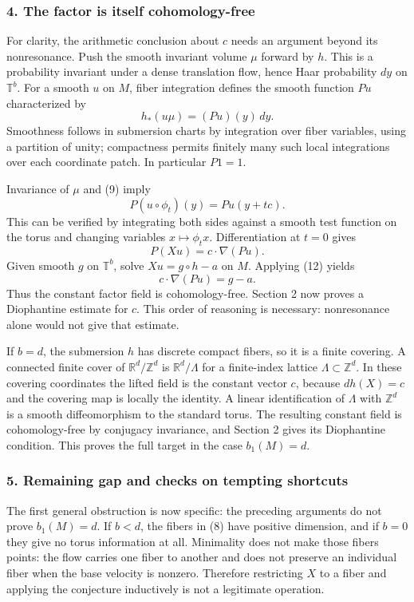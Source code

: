 \documentclass[11pt]{article}
\begin{document}
\subsubsection{4. The factor is itself cohomology-free}
For clarity, the arithmetic conclusion about $c$ needs an argument beyond its nonresonance. Push the smooth invariant volume $\mu$ forward by $h$. This is a probability invariant under a dense translation flow, hence Haar probability $dy$ on $\mathbb T^b$. For a smooth $u$ on $M$, fiber integration defines the smooth function $Pu$ characterized by
\[
 h_*(u\mu)=(Pu)(y)\,dy.                                 \tag{11}
\]
Smoothness follows in submersion charts by integration over fiber variables, using a partition of unity; compactness permits finitely many such local integrations over each coordinate patch. In particular $P1=1$.

Invariance of $\mu$ and (9) imply
\[
 P(u\circ\phi_t)(y)=Pu(y+tc).
\]
This can be verified by integrating both sides against a smooth test function on the torus and changing variables $x\mapsto\phi_t x$. Differentiation at $t=0$ gives
\[
 P(Xu)=c\cdot\nabla(Pu).                                \tag{12}
\]
Given smooth $g$ on $\mathbb T^b$, solve $Xu=g\circ h-a$ on $M$. Applying (12) yields
\[
 c\cdot\nabla(Pu)=g-a.
\]
Thus the constant factor field is cohomology-free. Section 2 now proves a Diophantine estimate for $c$. This order of reasoning is necessary: nonresonance alone would not give that estimate.

If $b=d$, the submersion $h$ has discrete compact fibers, so it is a finite covering. A connected finite cover of $\mathbb R^d/\mathbb Z^d$ is $\mathbb R^d/\Lambda$ for a finite-index lattice $\Lambda\subset\mathbb Z^d$. In these covering coordinates the lifted field is the constant vector $c$, because $dh(X)=c$ and the covering map is locally the identity. A linear identification of $\Lambda$ with $\mathbb Z^d$ is a smooth diffeomorphism to the standard torus. The resulting constant field is cohomology-free by conjugacy invariance, and Section 2 gives its Diophantine condition. This proves the full target in the case $b_1(M)=d$.

\subsubsection{5. Remaining gap and checks on tempting shortcuts}
The first general obstruction is now specific: the preceding arguments do not prove $b_1(M)=d$. If $b<d$, the fibers in (8) have positive dimension, and if $b=0$ they give no torus information at all. Minimality does not make those fibers points: the flow carries one fiber to another and does not preserve an individual fiber when the base velocity is nonzero. Therefore restricting $X$ to a fiber and applying the conjecture inductively is not a legitimate operation.
\end{document}
